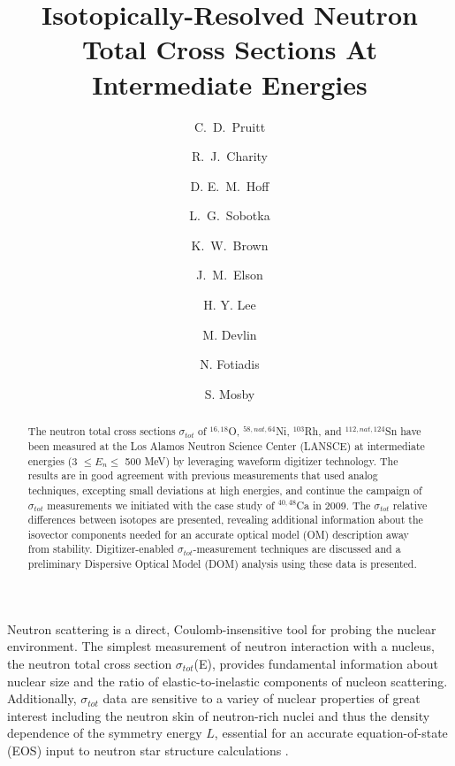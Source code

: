 \documentclass[twocolumn,secnumarabic,amssymb, nobibnotes, aps, prl,
superscriptaddress, nobalancelastpage]{revtex4}
\newcommand{\tot}{\ensuremath{\sigma_{tot}}}
\newcommand{\tots}{\ensuremath{\sigma_{tot}}\,\,}
\newcommand{\totE}{\ensuremath{\sigma_{tot}}(E)}
\begin{document}
\begin{abstract}
    The neutron total cross sections \tots of $^{16,18}$O,
    $^{58,nat,64}$Ni, $^{103}$Rh, and $^{112,nat,124}$Sn have been measured at the Los Alamos
    Neutron Science Center (LANSCE) at intermediate energies (3 $\leq E_{n}
    \leq$ 500 MeV) by
    leveraging waveform digitizer technology. The results are in good agreement
    with previous measurements that used analog techniques,
    excepting small deviations at high energies, and continue the campaign of
    \tots measurements we initiated with the case study of $^{40,48}$Ca in 2009.
    The \tots relative differences between isotopes are presented,
    revealing additional information about
    the isovector components needed for an accurate optical model (OM)
    description away from stability. Digitizer-enabled \tot-measurement
    techniques are discussed and a preliminary Dispersive Optical Model (DOM)
    analysis using these data is presented.
\end{abstract}

\title{Isotopically-Resolved Neutron Total Cross Sections At
Intermediate Energies}

\author{C.~D.~Pruitt}  
\author{R.~J.~Charity}
\author{D. E.~M.~Hoff}  
\author{L.~G.~Sobotka}
\author{K.~W.~Brown} 
\author{J.~M.~Elson}

\author{H. Y. Lee}
\author{M. Devlin}
\author{N. Fotiadis}
\author{S. Mosby}
\maketitle

Neutron scattering is a direct, Coulomb-insensitive tool for probing the nuclear
environment. The simplest measurement of neutron interaction with a nucleus,
the neutron total cross section \totE, provides fundamental information about
nuclear size and the ratio of elastic-to-inelastic components of nucleon 
scattering. Additionally, \tots data are sensitive to a variey of nuclear
properties of great interest including the neutron skin of neutron-rich nuclei
\cite{Mahzoon2017} and thus the density dependence of the symmetry energy $L$,
essential for an accurate equation-of-state (EOS) input to neutron star
structure calculations \cite{Fattoyev2012, Vinas2014, Brown2000}.
\end{document}
